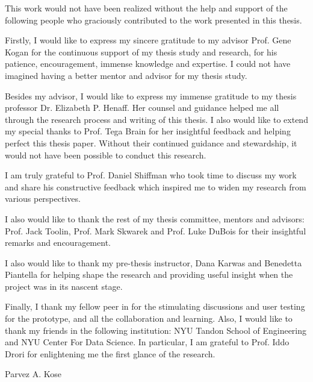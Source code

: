 %
%
%
%
%

\begin{acknowledgments} 

This work would not have been realized without the help and support of the following people who graciously contributed to the work presented in this thesis.

Firstly, I would like to express my sincere gratitude to my advisor Prof. Gene Kogan for the continuous support of my thesis study and research, for his patience, encouragement, immense knowledge and expertise. I could not have imagined having a better mentor and advisor for my thesis study.

Besides my advisor, I would like to express my immense gratitude to my thesis professor Dr. Elizabeth P. Henaff. Her counsel and guidance helped me all through the research process and writing of this thesis. I also would like to extend my special thanks to Prof. Tega Brain for her insightful feedback and helping perfect this thesis paper. Without their continued guidance and stewardship, it would not have been possible to conduct this research.

I am truly grateful to Prof. Daniel Shiffman who took time to discuss my work and share his constructive feedback which inspired me to widen my research from various perspectives.

I also would like to thank the rest of my thesis committee, mentors and advisors: Prof. Jack Toolin, Prof. Mark Skwarek and Prof. Luke DuBois for their insightful remarks and encouragement.

I also would like to thank my pre-thesis instructor, Dana Karwas and Benedetta Piantella for helping shape the research and providing useful insight when the project was in its nascent stage.

Finally, I thank my fellow peer in for the stimulating discussions and user testing for the prototype, and all the collaboration and learning. Also, I would like to thank my friends in the following institution: NYU Tandon School of Engineering and NYU Center For Data Science. In particular, I am grateful to Prof. Iddo Drori for enlightening me the first glance of the research.


\begin{flushright} 
Parvez A. Kose
\end{flushright}
\end{acknowledgments}

